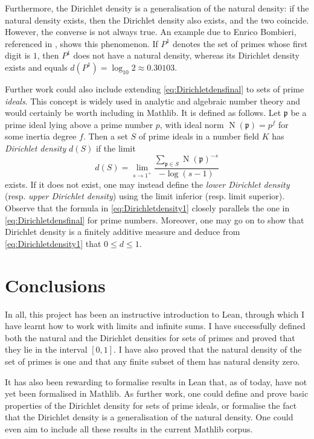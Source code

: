 \documentclass[a4paper,11pt]{article}
\theoremstyle{plain}
\DeclareMathOperator{\Norm}{N} %
\begin{document}
    Furthermore, the Dirichlet density is a generalisation of the natural density: if the natural density exists, then the Dirichlet density also exists, and the two coincide. However, the converse is not always true. An example due to Enrico Bombieri, referenced in \cite{Serre}, shows this phenomenon. If $P^1$ denotes the set of primes whose first digit is $1$, then $P^1$ does not have a natural density, whereas its Dirichlet density exists and equals $d(P^1)=\log_{10}2\approx0.30103$.

     Further work could also include extending \eqref{eq:Dirichletdensfinal} to sets of prime \emph{ideals}. This concept is widely used in analytic and algebraic number theory and would certainly be worth including in Mathlib. It is defined as follows. Let $\mathfrak{p}$ be a prime ideal lying above a prime number $p$, with ideal norm $\Norm(\mathfrak{p})=p^f$ for some inertia degree $f$. Then a set $S$ of prime ideals in a number field $K$ has \emph{Dirichlet density} $d(S)$ if the limit
	\begin{equation}\label{eq:Dirichletdensity1}
		d(S)=\lim_{s\rightarrow1^+}\frac{\sum_{\mathfrak{p}\in S}\Norm(\mathfrak{p})^{-s}}{-\log(s-1)}
	\end{equation}
	exists. If it does not exist, one may instead define the \emph{lower Dirichlet density} (resp. \emph{upper Dirichlet density}) using the limit inferior (resp. limit superior). Observe that the formula in \eqref{eq:Dirichletdensity1} closely parallels the one in \eqref{eq:Dirichletdensfinal} for prime numbers. Moreover, one may go on to show that Dirichlet density is a finitely additive measure and deduce from \eqref{eq:Dirichletdensity1} that $0\leq d\leq 1$.

\section{Conclusions}\label{sec:conclu}

	In all, this project has been an instructive introduction to Lean, through which I have learnt how to work with limits and infinite sums. I have successfully defined both the natural and the Dirichlet densities for sets of primes and proved that they lie in the interval $[0,1]$. I have also proved that the natural density of the set of primes is one and that any finite subset of them has natural density zero.
    
    It has also been rewarding to formalise results in Lean that, as of today, have not yet been formalised in Mathlib. As further work, one could define and prove basic properties of the Dirichlet density for sets of prime ideals, or formalise the fact that the Dirichlet density is a generalisation of the natural density. One could even aim to include all these results in the current Mathlib corpus.
	
    
    
		 
\end{document}
